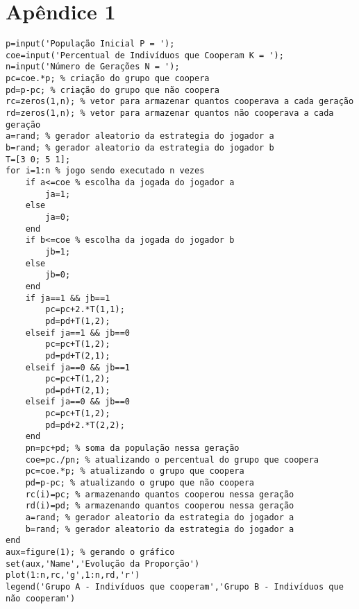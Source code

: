 %

\section*{Apêndice 1}

{\scriptsize
\begin{verbatim}
p=input('População Inicial P = ');
coe=input('Percentual de Indivíduos que Cooperam K = ');
n=input('Número de Gerações N = ');
pc=coe.*p; % criação do grupo que coopera
pd=p-pc; % criação do grupo que não coopera
rc=zeros(1,n); % vetor para armazenar quantos cooperava a cada geração
rd=zeros(1,n); % vetor para armazenar quantos não cooperava a cada geração
a=rand; % gerador aleatorio da estrategia do jogador a
b=rand; % gerador aleatorio da estrategia do jogador b
T=[3 0; 5 1];
for i=1:n % jogo sendo executado n vezes
    if a<=coe % escolha da jogada do jogador a
        ja=1;
    else
        ja=0;
    end
    if b<=coe % escolha da jogada do jogador b
        jb=1;
    else
        jb=0;
    end
    if ja==1 && jb==1
        pc=pc+2.*T(1,1);
        pd=pd+T(1,2);
    elseif ja==1 && jb==0
        pc=pc+T(1,2);
        pd=pd+T(2,1);
    elseif ja==0 && jb==1
        pc=pc+T(1,2);
        pd=pd+T(2,1);
    elseif ja==0 && jb==0
        pc=pc+T(1,2);
        pd=pd+2.*T(2,2);
    end
    pn=pc+pd; % soma da população nessa geração
    coe=pc./pn; % atualizando o percentual do grupo que coopera
    pc=coe.*p; % atualizando o grupo que coopera
    pd=p-pc; % atualizando o grupo que não coopera
    rc(i)=pc; % armazenando quantos cooperou nessa geração
    rd(i)=pd; % armazenando quantos cooperou nessa geração
    a=rand; % gerador aleatorio da estrategia do jogador a
    b=rand; % gerador aleatorio da estrategia do jogador a
end
aux=figure(1); % gerando o gráfico
set(aux,'Name','Evolução da Proporção')
plot(1:n,rc,'g',1:n,rd,'r')
legend('Grupo A - Indivíduos que cooperam','Grupo B - Indivíduos que não cooperam')
\end{verbatim}}



%